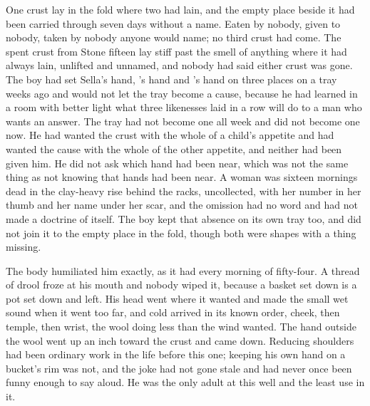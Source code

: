 One crust lay in the fold where two had lain, and the empty place beside it had been carried through seven days without a name. Eaten by nobody, given to nobody, taken by nobody anyone would name; no third crust had come. The spent crust from Stone fifteen lay stiff past the smell of anything where it had always lain, unlifted and unnamed, and nobody had said either crust was gone. The boy had set Sella's hand, 's hand and 's hand on three places on a tray weeks ago and would not let the tray become a cause, because he had learned in a room with better light what three likenesses laid in a row will do to a man who wants an answer. The tray had not become one all week and did not become one now. He had wanted the crust with the whole of a child's appetite and had wanted the cause with the whole of the other appetite, and neither had been given him. He did not ask which hand had been near, which was not the same thing as not knowing that hands had been near. A woman was sixteen mornings dead in the clay-heavy rise behind the racks, uncollected,  with her number in her thumb and her name under her scar, and the omission had no word and had not made a doctrine of itself. The boy kept that absence on its own tray too, and did not join it to the empty place in the fold, though both were shapes with a thing missing.

The body humiliated him exactly, as it had every morning of fifty-four. A thread of drool froze at his mouth and nobody wiped it, because a basket set down is a pot set down and left. His head went where it wanted and made the small wet sound when it went too far, and cold arrived in its known order, cheek, then temple, then wrist, the wool doing less than the wind wanted. The hand outside the wool went up an inch toward the crust and came down. Reducing shoulders had been ordinary work in the life before this one; keeping his own hand on a bucket's rim was not, and the joke had not gone stale and had never once been funny enough to say aloud. He was the only adult at this well and the least use in it.

\scenebreak

